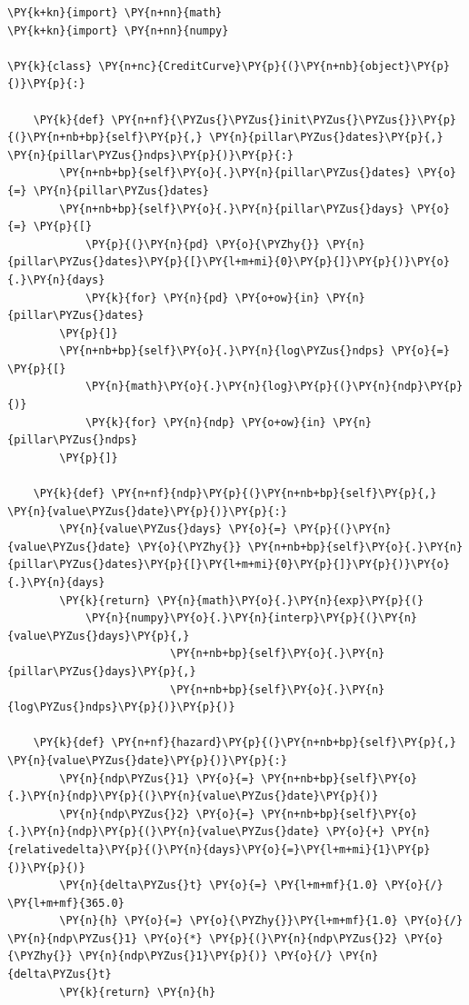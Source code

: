 \begin{tcolorbox}[breakable, size=fbox, boxrule=1pt, pad at break*=1mm,colback=cellbackground, colframe=cellborder]
\begin{Verbatim}[commandchars=\\\{\}]
\PY{k+kn}{import} \PY{n+nn}{math}
\PY{k+kn}{import} \PY{n+nn}{numpy}

\PY{k}{class} \PY{n+nc}{CreditCurve}\PY{p}{(}\PY{n+nb}{object}\PY{p}{)}\PY{p}{:}
    
    \PY{k}{def} \PY{n+nf}{\PYZus{}\PYZus{}init\PYZus{}\PYZus{}}\PY{p}{(}\PY{n+nb+bp}{self}\PY{p}{,} \PY{n}{pillar\PYZus{}dates}\PY{p}{,} \PY{n}{pillar\PYZus{}ndps}\PY{p}{)}\PY{p}{:}    
        \PY{n+nb+bp}{self}\PY{o}{.}\PY{n}{pillar\PYZus{}dates} \PY{o}{=} \PY{n}{pillar\PYZus{}dates}
        \PY{n+nb+bp}{self}\PY{o}{.}\PY{n}{pillar\PYZus{}days} \PY{o}{=} \PY{p}{[}
            \PY{p}{(}\PY{n}{pd} \PY{o}{\PYZhy{}} \PY{n}{pillar\PYZus{}dates}\PY{p}{[}\PY{l+m+mi}{0}\PY{p}{]}\PY{p}{)}\PY{o}{.}\PY{n}{days}
            \PY{k}{for} \PY{n}{pd} \PY{o+ow}{in} \PY{n}{pillar\PYZus{}dates}
        \PY{p}{]}
        \PY{n+nb+bp}{self}\PY{o}{.}\PY{n}{log\PYZus{}ndps} \PY{o}{=} \PY{p}{[}
            \PY{n}{math}\PY{o}{.}\PY{n}{log}\PY{p}{(}\PY{n}{ndp}\PY{p}{)}
            \PY{k}{for} \PY{n}{ndp} \PY{o+ow}{in} \PY{n}{pillar\PYZus{}ndps}
        \PY{p}{]}
        
    \PY{k}{def} \PY{n+nf}{ndp}\PY{p}{(}\PY{n+nb+bp}{self}\PY{p}{,} \PY{n}{value\PYZus{}date}\PY{p}{)}\PY{p}{:}
        \PY{n}{value\PYZus{}days} \PY{o}{=} \PY{p}{(}\PY{n}{value\PYZus{}date} \PY{o}{\PYZhy{}} \PY{n+nb+bp}{self}\PY{o}{.}\PY{n}{pillar\PYZus{}dates}\PY{p}{[}\PY{l+m+mi}{0}\PY{p}{]}\PY{p}{)}\PY{o}{.}\PY{n}{days}
        \PY{k}{return} \PY{n}{math}\PY{o}{.}\PY{n}{exp}\PY{p}{(}
            \PY{n}{numpy}\PY{o}{.}\PY{n}{interp}\PY{p}{(}\PY{n}{value\PYZus{}days}\PY{p}{,}
                         \PY{n+nb+bp}{self}\PY{o}{.}\PY{n}{pillar\PYZus{}days}\PY{p}{,}
                         \PY{n+nb+bp}{self}\PY{o}{.}\PY{n}{log\PYZus{}ndps}\PY{p}{)}\PY{p}{)}
    
    \PY{k}{def} \PY{n+nf}{hazard}\PY{p}{(}\PY{n+nb+bp}{self}\PY{p}{,} \PY{n}{value\PYZus{}date}\PY{p}{)}\PY{p}{:}
        \PY{n}{ndp\PYZus{}1} \PY{o}{=} \PY{n+nb+bp}{self}\PY{o}{.}\PY{n}{ndp}\PY{p}{(}\PY{n}{value\PYZus{}date}\PY{p}{)}
        \PY{n}{ndp\PYZus{}2} \PY{o}{=} \PY{n+nb+bp}{self}\PY{o}{.}\PY{n}{ndp}\PY{p}{(}\PY{n}{value\PYZus{}date} \PY{o}{+} \PY{n}{relativedelta}\PY{p}{(}\PY{n}{days}\PY{o}{=}\PY{l+m+mi}{1}\PY{p}{)}\PY{p}{)}
        \PY{n}{delta\PYZus{}t} \PY{o}{=} \PY{l+m+mf}{1.0} \PY{o}{/} \PY{l+m+mf}{365.0}
        \PY{n}{h} \PY{o}{=} \PY{o}{\PYZhy{}}\PY{l+m+mf}{1.0} \PY{o}{/} \PY{n}{ndp\PYZus{}1} \PY{o}{*} \PY{p}{(}\PY{n}{ndp\PYZus{}2} \PY{o}{\PYZhy{}} \PY{n}{ndp\PYZus{}1}\PY{p}{)} \PY{o}{/} \PY{n}{delta\PYZus{}t}
        \PY{k}{return} \PY{n}{h}


\end{Verbatim}
\end{tcolorbox}
